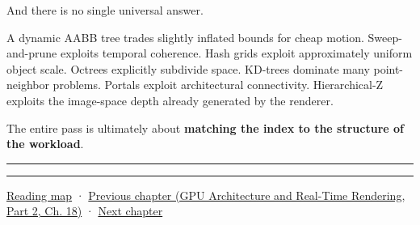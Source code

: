 And there is no single universal answer.

A dynamic AABB tree trades slightly inflated bounds for cheap motion. Sweep-and-prune exploits temporal coherence. Hash grids exploit approximately uniform object scale. Octrees explicitly subdivide space. KD-trees dominate many point-neighbor problems. Portals exploit architectural connectivity. Hierarchical-Z exploits the image-space depth already generated by the renderer.

The entire pass is ultimately about \textbf{matching the index to the structure of the workload}.

\begin{center}\rule{0.5\linewidth}{0.5pt}\end{center}

\begin{center}\rule{0.5\linewidth}{0.5pt}\end{center}

\hyperref[volume-reading-map]{Reading map} · \href{../06-GPU-Architecture-and-Real-Time-Rendering-P02/main.pdf\#nameddest=06-engine-ii-ch027-preparing-and-publishing-runtime-content}{Previous chapter (GPU Architecture and Real-Time Rendering, Part 2, Ch. 18)} · \hyperref[06-engine-ii-ch029-dynamic-spatial-indices-for-moving-worlds]{Next chapter}
